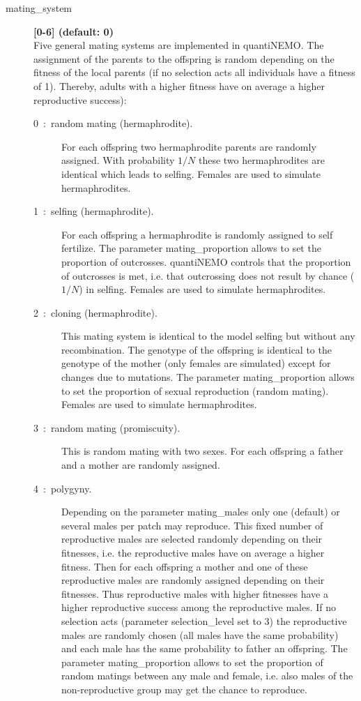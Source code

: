 \documentclass[letterpaper,12pt,oneside]{book}
\begin{document}
\begin{description}

\item[mating\_system]\textbf{[0-6] (default: 0)}\\
Five general mating systems are implemented in quantiNEMO. The assignment of the parents to the offspring is random depending on the fitness of the local parents (if no selection acts all individuals have a fitness of 1). Thereby, adults with a higher fitness have on average a higher reproductive success):

\begin{description}
\item [0~:~random mating (hermaphrodite).] For each offspring two hermaphrodite parents are randomly assigned. With probability $1/N$ these two hermaphrodites are identical which leads to selfing. Females are used to simulate hermaphrodites. 

\item [1~:~selfing (hermaphrodite).] For each offspring a hermaphrodite is randomly assigned to self fertilize. The parameter \textsf{mating\_proportion} allows to set the proportion of outcrosses. quantiNEMO controls that the proportion of outcrosses is met, i.e. that outcrossing does not result by chance ($1/N$) in selfing. Females are used to simulate hermaphrodites.

\item [2~:~cloning (hermaphrodite).] This mating system is identical to the model selfing but without any recombination. The genotype of the offspring is identical to the genotype of the mother (only females are simulated) except for changes due to mutations. The parameter \textsf{mating\_proportion} allows to set the proportion of sexual reproduction (random mating). Females are used to simulate hermaphrodites.

\item [3~:~random mating (promiscuity).] This is random mating with two sexes. For each offspring a father and a mother are randomly assigned.

\item [4~:~polygyny.] Depending on the parameter \textsf{mating\_males} only one (default) or several males per patch may reproduce. This fixed number of reproductive males are selected randomly depending on their fitnesses, i.e. the reproductive males have on average a higher fitness. Then for each offspring a mother and one of these reproductive males are randomly assigned depending on their fitnesses. Thus reproductive males with higher fitnesses have a higher reproductive success among the reproductive males. If no selection acts (parameter \textsf{selection\_level} set to 3) the reproductive males are randomly chosen (all males have the same probability) and each male has the same probability to father an offspring. The parameter \textsf{mating\_proportion} allows to set the proportion of random matings between any male and female, i.e. also males of the non-reproductive group may get the chance to reproduce.


\end{description}
\end{description}
\end{document}
